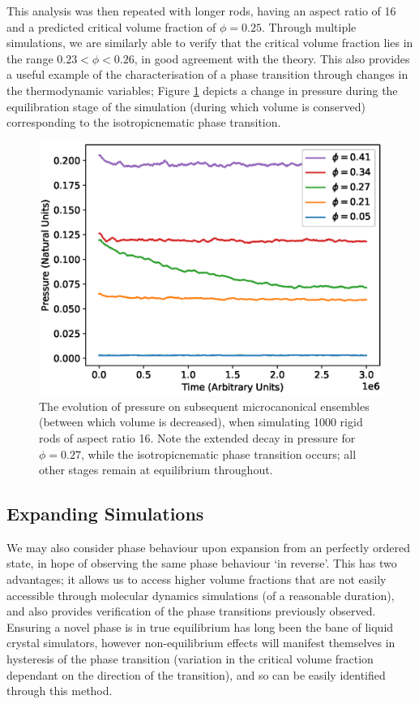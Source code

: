 \documentclass[11pt, a4paper]{article} %
\begin{document}
This analysis was then repeated with longer rods, having an aspect ratio of \num{16} and a predicted critical volume fraction of $\phi  = 0.25$. Through multiple simulations, we are similarly able to verify that the critical volume fraction lies in the range $0.23 < \phi< 0.26$, in good agreement with the theory. This also provides a useful example of the characterisation of a phase transition through changes in the thermodynamic variables; Figure \ref{fig:rr_pressureevo} depicts a change in pressure during the equilibration stage of the simulation (during which volume is conserved) corresponding to the isotropic\textendash nematic phase transition.

\begin{figure} [h!]
	\centering
	\includegraphics[width=0.7\linewidth]{Figures/rigidrod_pressureevo}
	\caption{The evolution of pressure on subsequent microcanonical ensembles (between which volume is decreased), when simulating 1000 rigid rods of aspect ratio 16. Note the extended decay in pressure for $\phi  = 0.27$, while the isotropic\textendash nematic phase transition occurs; all other stages remain at equilibrium throughout.}
	\label{fig:rr_pressureevo}
\end{figure} %



\subsection{Expanding Simulations}

We may also consider phase behaviour upon expansion from an perfectly ordered state, in hope of observing the same phase behaviour `in reverse'. This has two advantages; it allows us to access higher volume fractions that are not easily accessible through molecular dynamics simulations (of a reasonable duration), and also provides verification of the phase transitions previously observed. Ensuring a novel phase is in true equilibrium has long been the bane of liquid crystal simulators, however non-equilibrium effects will manifest themselves in hysteresis of the phase transition (variation in the critical volume fraction dependant on the direction of the transition), and so can be easily identified through this method.
\end{document}
